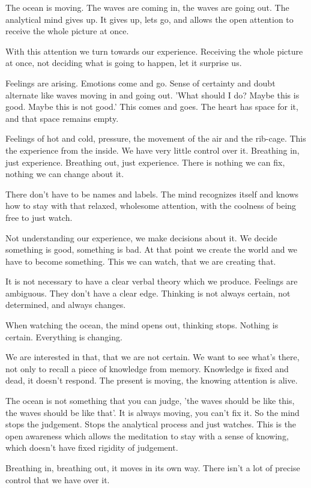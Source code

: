 The ocean is moving. The waves are coming in, the waves are going out.
The analytical mind gives up. It gives up, lets go, and allows the open
attention to receive the whole picture at once.

With this attention we turn towards our experience. Receiving the whole
picture at once, not deciding what is going to happen, let it surprise
us.

Feelings are arising. Emotions come and go. Sense of certainty and doubt
alternate like waves moving in and going out. 'What should I do? Maybe
this is good. Maybe this is not good.' This comes and goes. The heart
has space for it, and that space remains empty.

Feelings of hot and cold, pressure, the movement of the air and the
rib-cage. This the experience from the inside. We have very little
control over it. Breathing in, just experience. Breathing out, just
experience. There is nothing we can fix, nothing we can change about it.

There don't have to be names and labels. The mind recognizes itself and
knows how to stay with that relaxed, wholesome attention, with the
coolness of being free to just watch.

Not understanding our experience, we make decisions about it. We decide
something is good, something is bad. At that point we create the world
and we have to become something. This we can watch, that we are creating
that.

It is not necessary to have a clear verbal theory which we produce.
Feelings are ambiguous. They don't have a clear edge. Thinking is not
always certain, not determined, and always changes.

When watching the ocean, the mind opens out, thinking stops. Nothing is
certain. Everything is changing.

We are interested in that, that we are not certain. We want to see
what's there, not only to recall a piece of knowledge from memory.
Knowledge is fixed and dead, it doesn't respond. The present is moving,
the knowing attention is alive.

The ocean is not something that you can judge, 'the waves should be like
this, the waves should be like that'. It is always moving, you can't fix
it. So the mind stops the judgement. Stops the analytical process and
just watches. This is the open awareness which allows the meditation to
stay with a sense of knowing, which doesn't have fixed rigidity of
judgement.

Breathing in, breathing out, it moves in its own way. There isn't a lot
of precise control that we have over it.

